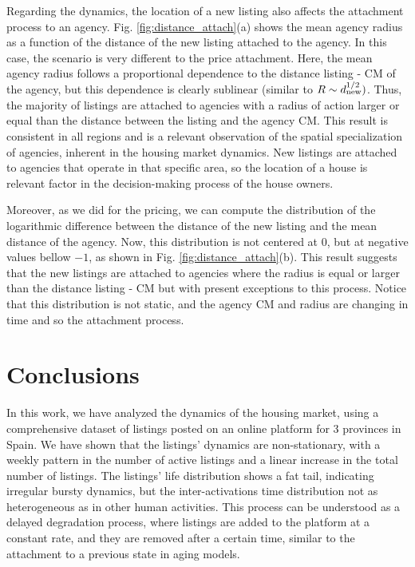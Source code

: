 Regarding the dynamics, the location of a new listing also affects the attachment process to an agency. Fig. \ref{fig:distance_attach}(a) shows the mean agency radius as a function of the distance of the new listing attached to the agency. In this case, the scenario is very different to the price attachment. Here, the mean agency radius follows a proportional dependence to the distance listing - CM of the agency, but this dependence is clearly sublinear (similar to $R \sim d_{\rm new}^{1/2})$. Thus, the majority of listings are attached to agencies with a radius of action larger or equal than the distance between the listing and the agency CM. This result is consistent in all regions and is a relevant observation of the spatial specialization of agencies, inherent in the housing market dynamics. New listings are attached to agencies that operate in that specific area, so the location of a house is relevant factor in the decision-making process of the house owners.

Moreover, as we did for the pricing, we can compute the distribution of the logarithmic difference between the distance of the new listing and the mean distance of the agency. Now, this distribution is not centered at $0$, but at negative values bellow $-1$, as shown in Fig. \ref{fig:distance_attach}(b). This result suggests that the new listings are attached to agencies where the radius is equal or larger than the distance listing - CM but with present exceptions to this process. Notice that this distribution is not static, and the agency CM and radius are changing in time and so the attachment process.


\section{Conclusions}

In this work, we have analyzed the dynamics of the housing market, using a comprehensive dataset of listings posted on an online platform for 3 provinces in Spain. We have shown that the listings' dynamics are non-stationary, with a weekly pattern in the number of active listings and a linear increase in the total number of listings. The listings' life distribution shows a fat tail, indicating irregular bursty dynamics, but the inter-activations time distribution not as heterogeneous as in other human activities. This process can be understood as a delayed degradation process, where listings are added to the platform at a constant rate, and they are removed after a certain time, similar to the attachment to a previous state in aging models. 

